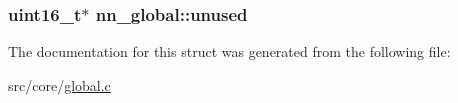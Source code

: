 \subsubsection[{unused}]{\setlength{\rightskip}{0pt plus 5cm}uint16\+\_\+t$\ast$ nn\+\_\+global\+::unused}\hypertarget{structnn__global_adfca766f62f1d6fa7f676453083c71e7}{}\label{structnn__global_adfca766f62f1d6fa7f676453083c71e7}


The documentation for this struct was generated from the following file\+:\begin{DoxyCompactItemize}
\item 
src/core/\hyperlink{global_8c}{global.\+c}\end{DoxyCompactItemize}
